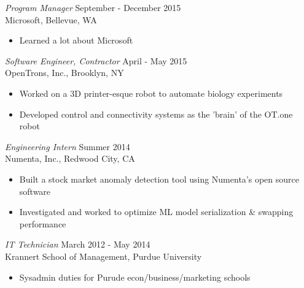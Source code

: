 \documentclass[margin,4pt]{res} %
\begin{document}
\begin{resume}
	{\sl Program Manager} \hfill September - December 2015\\
		Microsoft, Bellevue, WA
		\begin{itemize} \itemsep -2pt
		\item Learned a lot about Microsoft
		\end{itemize}

	{\sl Software Engineer, Contractor} \hfill April - May 2015\\
		OpenTrons, Inc., Brooklyn, NY
		\begin{itemize} \itemsep -2pt
		\item Worked on a 3D printer-esque robot to automate biology experiments
		\item Developed control and connectivity systems as the 'brain' of the OT.one robot
		\end{itemize}

	
	{\sl Engineering Intern} \hfill Summer 2014\\
          Numenta, Inc., Redwood City, CA
		\begin{itemize} \itemsep -2pt
		\item Built a stock market anomaly detection tool using Numenta's open source software
		\item Investigated and worked to optimize ML model serialization \& swapping performance
		\end{itemize}

	{\sl IT Technician} \hfill March 2012 - May 2014 \\
         	Krannert School of Management, Purdue University
		\begin{itemize} \itemsep -2pt
	        \item Sysadmin duties for Purude econ/business/marketing schools
		\end{itemize}


\end{resume}
\end{document}
